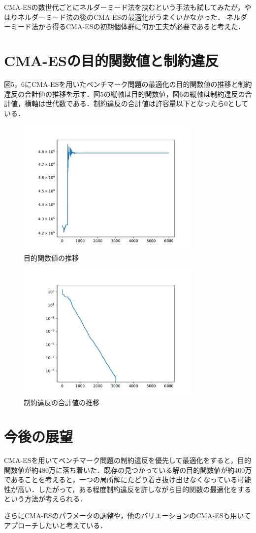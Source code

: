 \documentclass[twocolumn]{jarticle}
\begin{document}
	CMA-ESの数世代ごとにネルダーミード法を挟むという手法も試してみたが，やはりネルダーミード法の後のCMA-ESの最適化がうまくいかなかった．
	ネルダーミード法から得るCMA-ESの初期個体群に何か工夫が必要であると考えた．
\section{CMA-ESの目的関数値と制約違反}
	図5，6にCMA-ESを用いたベンチマーク問題の最適化の目的関数値の推移と制約違反の合計値の推移を示す．図5の縦軸は目的関数値，図6の縦軸は制約違反の合計値，横軸は世代数である．制約違反の合計値は許容量以下となったら0としている．
	\begin{figure}	%
		\centering
		\includegraphics[width=9cm]{cmaes.pdf}
		\caption{目的関数値の推移}
	\end{figure}
	\begin{figure}	%
		\centering
		\includegraphics[width=9cm]{cmaes_V.pdf}
		\caption{制約違反の合計値の推移}
	\end{figure}

\section{今後の展望}
	CMA-ESを用いてベンチマーク問題の制約違反を優先して最適化をすると，目的関数値が約480万に落ち着いた．既存の見つかっている解の目的関数値が約400万であることを考えると，一つの局所解にたどり着き抜け出せなくなっている可能性が高い．したがって，ある程度制約違反を許しながら目的関数の最適化をするという方法が考えられる．

	さらにCMA-ESのパラメータの調整や，他のバリエーションのCMA-ESも用いてアプローチしたいと考えている．

\end{document}
